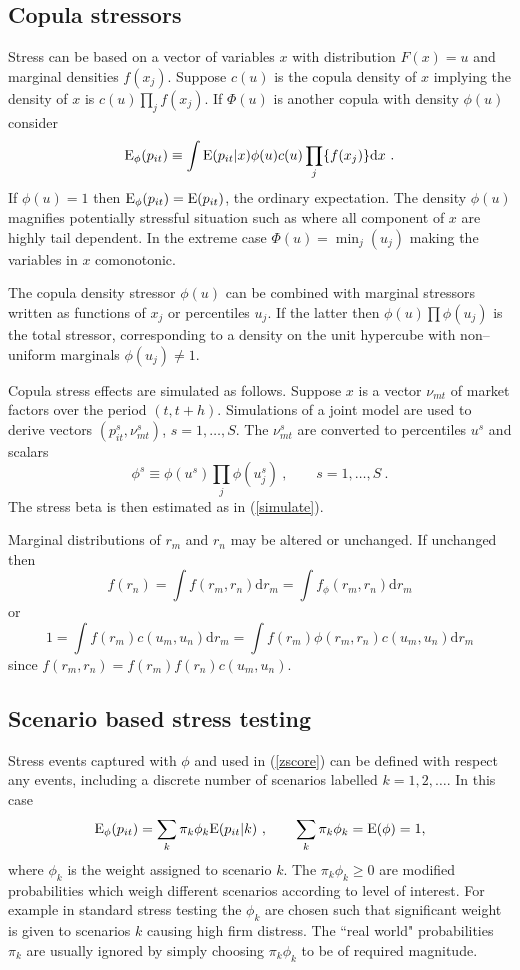 \documentclass[authoryear]{elsarticle}
\newcommand{\E}{\mathrm{E}}
\newcommand{\de}{\mathrm{d}}
\newcommand{\eref}[1]{(\ref{#1})}
\newcommand{\cq}{\ , \qquad}
\newcommand{\be}[1]{\begin{equation}\label{#1}}
\newcommand{\ee}{\end{equation}}
\begin{document}
\subsection{Copula stressors}


Stress can be based on a vector of variables $x$ with distribution $F(x)=u$ and marginal densities $f(x_j)$.    Suppose $c(u)$ is the copula density of $x$ implying the density of $x$ is $c(u)\prod_jf(x_j)$.    If  $\Phi(u)$ is another copula with density $\phi(u)$ 
consider
\be{copula}
\Es(p_{it}) \equiv \int \E(p_{it}|x)\phi(u)c(u)\prod_j\{f(x_j)\}  \de x   \ .
\ee
If $\phi(u)=1$  then $\Es(p_{it})=\E(p_{it})$, the ordinary expectation.   The density $\phi(u)$ magnifies potentially stressful situation such as where all component of $x$ are highly  tail dependent.     In the extreme case  $\Phi(u)=\min_j(u_j)$ making the  variables in $x$  comonotonic. 

The copula density stressor $\phi(u)$  can be combined with marginal stressors written as functions of $x_j$ or  percentiles $u_j$.  If the latter then $\phi(u)\prod\phi(u_j)$ is the total stressor, corresponding to a density on the unit hypercube with non--uniform marginals  $\phi(u_j)\ne 1$. 
  
Copula stress effects are simulated as follows.   Suppose $x$ is a vector $\nu_{mt}$ of  market factors  over the period $(t,t+h)$.   Simulations of a joint model are  used to  derive  vectors $(p_{it}^s,\nu_{mt}^s)$, $ s=1,\ldots, S$.  The $\nu_{mt}^s$ are  converted to percentiles $u^s$ and scalars 
$$
\phi^s\equiv\phi(u^s)\prod_j\phi(u_j^s)\cq s=1,\ldots, S\ .
$$
The stress beta is then estimated as in \eref{simulate}.



   
Marginal distributions of $r_m$ and $r_n$ may be altered or unchanged. If unchanged then
$$
f(r_n) = \int f(r_m,r_n) \de r_m = \int f_\phi(r_m,r_n) \de r_m
$$
or 
$$
1 = \int f(r_m)c(u_m,u_n) \de r_m = \int f(r_m)\phi(r_m,r_n) c(u_m,u_n) \de r_m
$$
since $f(r_m,r_n)=f(r_m)f(r_n)c(u_m,u_n)$.   


 
 \subsection{Scenario based stress testing}
 Stress events captured with $\phi$ and used  in \eref{zscore}  can be defined with respect any events, including a discrete number of scenarios labelled $k=1,2, \ldots$.   In this case 
$$
\Es(p_{it})= \sum_k \pi_k\phi_k\E(p_{it}|k)\cq \sum_k\pi_k\phi_k = \E(\phi) = 1 ,
$$
where $\phi_k$ is the weight assigned to scenario $k$.   The $\pi_k\phi_k\ge 0$ are  modified  probabilities which weigh different scenarios according to level of interest.   For example in standard stress testing the $\phi_k$ are chosen such that significant weight is given to scenarios $k$ causing high  firm distress.   The ``real world" probabilities $\pi_k$ are  usually ignored by  simply choosing  $\pi_k\phi_k$ to be of  required magnitude. 
\end{document}
